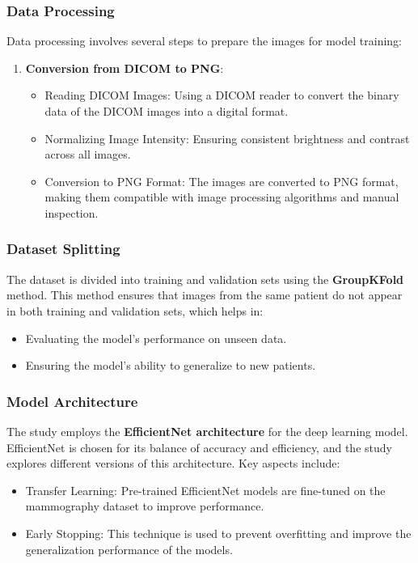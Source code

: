 \documentclass[12]{article}
\begin{document}
\subsubsection{Data Processing}

Data processing involves several steps to prepare the images for model training:
\begin{enumerate}
    \item \textbf{Conversion from DICOM to PNG}:
    \begin{itemize}
        \item {Reading DICOM Images}: Using a DICOM reader to convert the binary data of the DICOM images into a digital format.
        \item {Normalizing Image Intensity}: Ensuring consistent brightness and contrast across all images.
        \item {Conversion to PNG Format}: The images are converted to PNG format, making them compatible with image processing algorithms and manual inspection.
    \end{itemize}
\end{enumerate}

\subsubsection{Dataset Splitting}

The dataset is divided into training and validation sets using the \textbf{GroupKFold} method. This method ensures that images from the same patient do not appear in both training and validation sets, which helps in:
\begin{itemize}
    \item Evaluating the model's performance on unseen data.
    \item Ensuring the model's ability to generalize to new patients.
\end{itemize}

\subsubsection{Model Architecture}

The study employs the \textbf{EfficientNet architecture} for the deep learning model. EfficientNet is chosen for its balance of accuracy and efficiency, and the study explores different versions of this architecture. Key aspects include:
\begin{itemize}
    \item {Transfer Learning}: Pre-trained EfficientNet models are fine-tuned on the mammography dataset to improve performance.
    \item {Early Stopping}: This technique is used to prevent overfitting and improve the generalization performance of the models.
\end{itemize}
\end{document}
